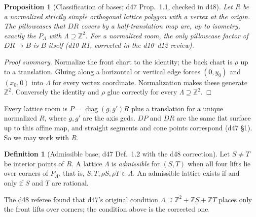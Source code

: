 \documentclass[11pt]{article}
\newtheorem{proposition}{Proposition}
\theoremstyle{definition}
\newtheorem{definition}{Definition}
\theoremstyle{remark}
\newcommand{\Z}{\mathbb Z}
\begin{document}
\begin{proposition}[Classification of bases; d47 Prop.~1.1, checked in d48]\label{prop:bases}
Let $R$ be a normalized strictly simple orthogonal lattice polygon with a
vertex at the origin. The pillowcases that $DR$ covers by a half-translation
map are, up to isometry, exactly the $P_\Lambda$ with $\Lambda\supseteq\Z^2$.
For a normalized room, the only pillowcase factor of $DR\to B$ is $B$ itself
(d10 R1, corrected in the d10--d12 review).
\end{proposition}

\begin{proof}[Proof summary]
Normalize the front chart to the identity; the back chart is $\rho$ up to a
translation. Gluing along a horizontal or vertical edge forces $(0,y_0)$ and
$(x_0,0)$ into $\Lambda$ for every vertex coordinate. Normalization makes these
generate $\Z^2$. Conversely the identity and $\rho$ glue correctly for every
$\Lambda\supseteq\Z^2$.
\end{proof}

Every lattice room is $P=\operatorname{diag}(g,g')R$ plus a translation for a
unique normalized $R$, where $g,g'$ are the axis gcds. $DP$ and $DR$ are the
same flat surface up to this affine map, and straight segments and cone points
correspond (d47 \S1). So we may work with $R$.

\begin{definition}[Admissible base; d47 Def.~1.2 with the d48 correction]\label{def:admissible}
Let $S\ne T$ be interior points of $R$. A lattice $\Lambda$ is
\emph{admissible} for $(S,T)$ when all four lifts lie over corners of
$P_\Lambda$, that is, $S,T,\rho S,\rho T\in\Lambda$. An admissible lattice
exists if and only if $S$ and $T$ are rational.
\end{definition}

The d48 referee found that d47's original condition
$\Lambda\supseteq\Z^2+\Z S+\Z T$ places only the front lifts over corners;
the condition above is the corrected one.
\end{document}
